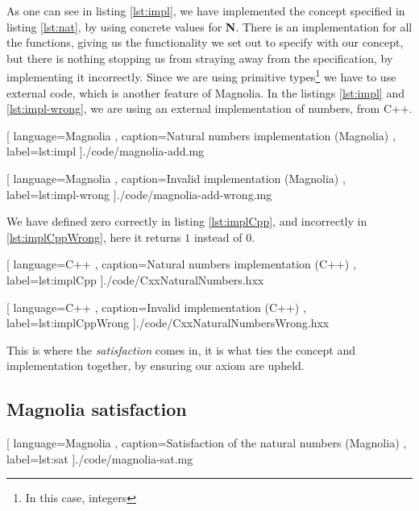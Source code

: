 As one can see in listing \ref{lst:impl}, we have implemented the concept
specified in listing \ref{lst:nat}, by using concrete values for \textbf{N}.
There is an implementation for all the functions, giving us the functionality we
set out to specify with our concept, but there is nothing stopping us from
straying away from the specification, by implementing it incorrectly. Since we
are using primitive types\footnote{In this case, integers} we have to use
external code, which is another feature of Magnolia. In the listings
\ref{lst:impl} and \ref{lst:impl-wrong}, we are using an external implementation
of numbers, from C++.

\begin{code}[H]
  
    [ language=Magnolia
    , caption={Natural numbers implementation (Magnolia)}
    , label=lst:impl
    ]{./code/magnolia-add.mg}
\end{code}

\begin{code}[H]
  
    [ language=Magnolia
    , caption={Invalid implementation (Magnolia)}
    , label=lst:impl-wrong
    ]{./code/magnolia-add-wrong.mg}
\end{code}

We have defined zero correctly in listing \ref{lst:implCpp}, and incorrectly in
\ref{lst:implCppWrong}, here it returns $1$ instead of $0$.

\begin{code}[H]
  
    [ language=C++
    , caption={Natural numbers implementation (C++)}
    , label=lst:implCpp
    ]{./code/CxxNaturalNumbers.hxx}
\end{code}

\begin{code}[H]
  
    [ language=C++
    , caption={Invalid implementation (C++)}
    , label=lst:implCppWrong
    ]{./code/CxxNaturalNumbersWrong.hxx}
\end{code}

This is where the
\textit{satisfaction} comes in, it is what ties the concept and implementation
together, by ensuring our axiom are upheld.

\subsection{Magnolia satisfaction}

\begin{center}
  
    [ language=Magnolia
    , caption={Satisfaction of the natural numbers (Magnolia)}
    , label=lst:sat
    ]{./code/magnolia-sat.mg}
\end{center}


